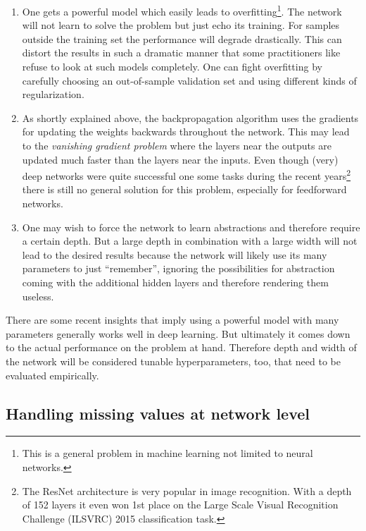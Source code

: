 \begin{enumerate}
	\item One gets a powerful model which easily leads to overfitting\footnote{%
		This is a general problem in machine learning not limited to neural networks.}.
	The network will not learn to solve the problem but just echo its training. For samples outside the training set the performance will degrade drastically. This can distort the results in such a dramatic manner that some practitioners like \cite[p.\,23: When not to Backtest a Strategy]{Chan-2013} refuse to look at such models completely. One can fight overfitting by carefully choosing an out-of-sample validation set and using different kinds of regularization.
	
	\item As shortly explained above, the backpropagation algorithm uses the gradients for updating the weights backwards throughout the network. This may lead to the \emph{vanishing gradient problem} where the layers near the outputs are updated much faster than the layers near the inputs. Even though (very) deep networks were quite successful one some tasks during the recent years\footnote{%
		The ResNet architecture is very popular in image recognition. With a depth of 152 layers it even won 1st place on the Large Scale Visual Recognition Challenge (ILSVRC) 2015 classification task.\cite{DBLP:journals/corr/HeZRS15}}
	there is still no general solution for this problem, especially for feedforward networks.
	
	\item One may wish to force the network to learn abstractions and therefore require a certain depth. But a large depth in combination with a large width will not lead to the desired results because the network will likely use its many parameters to just ``remember'', ignoring the possibilities for abstraction coming with the additional hidden layers and therefore rendering them useless.
\end{enumerate}

There are some recent insights that imply using a powerful model with many parameters generally works well in deep learning.\cite{DBLP:journals/corr/ZhangBHRV16} But ultimately it comes down to the actual performance on the problem at hand. Therefore depth and width of the network will be considered tunable hyperparameters, too, that need to be evaluated empirically.

\subsection{Handling missing values at network level}

